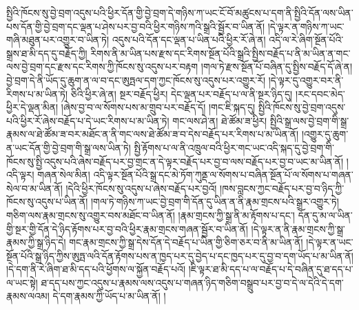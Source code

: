སྤྱིའི་ཁོངས་སུ་བྱེ་བྲག་འདུས་པའི་ཕྱིར་དོན་གྱི་བྱེ་བྲག་དེ་གཉིས་ཀ་ཡང་ངོ་བོ་མཚུངས་པ་དག་ནི་སྤྱིའི་དོན་ལས་ཡིན་པས་དོན་གྱི་བྱེ་བྲག་དང་ལྡན་པ་ཤེས་པར་བྱ་བའི་ཕྱིར་གཉིས་ཀའི་སྒྲའི་སྦྱོར་བ་ཡིན་ནོ། །དེ་ལྟར་ན་གཉིས་ཀ་ཡང་གཞི་མཐུན་པར་འགྱུར་བ་ཡིན་ཏེ། འདུས་པའི་དོན་དང་ལྡན་པ་ཡིན་པའི་ཕྱིར་རོ་ཞེ་ན། འདི་ལ་རེ་ཞིག་སྔོན་པོའི་སྒྲས་ཐ་མི་དད་དུ་བརྗོད་ཀྱི། རིགས་ནི་མ་ཡིན་པས་རྫས་དང་རིགས་སྔོན་པོའི་སྒྲའི་སྤྱིས་བརྗོད་པ་ནི་མ་ཡིན་ན་གང་ལས་བྱེ་བྲག་དང་རྫས་དང་རིགས་ཀྱི་ཁོངས་སུ་འདུས་པར་བརྟག །གལ་ཏེ་རྫས་སྔོན་པོ་བཞིན་དུ་སྤྱིས་བརྗོད་དོ་ཞེ་ན། བྱེ་བྲག་དེ་ནི་ཡོད་དུ་ཆུག་ན་ལ་བ་དང་ཨུཏྤལ་དག་ཀྱང་ཁོངས་སུ་འདུས་པར་འགྱུར་རོ། །དེ་ལྟར་དུ་འགྱུར་བར་ནི་རིགས་པ་མ་ཡིན་ཏེ། ཅིའི་ཕྱིར་ཞེ་ན། སྔར་བརྗོད་ཕྱིར། དེང་ལྡན་པར་བརྗོད་པ་ལ་ནི་སྔར་ཉིད་དུ། །རང་དབང་མེད་ཕྱིར་དེ་ལྡན་མིན། །ཞེས་བྱ་བ་ལ་སོགས་པས་མ་གྲུབ་པར་བརྗོད་དོ། །གང་ཇི་སྐད་དུ། སྤྱིའི་ཁོངས་སུ་བྱེ་བྲག་འདུས་པའི་ཕྱིར་རོ་ཞེས་བརྗོད་པ་དེ་ཡང་རིགས་པ་མ་ཡིན་ཏེ། གང་ལས་ཤེ་ན། ཐེ་ཚོམ་ཟ་ཕྱིར། སྤྱིའི་སྒྲ་ལས་བྱེ་བྲག་གི་སྒྲ་རྣམས་ལ་ཐེ་ཚོམ་ཟ་བར་མཐོང་ན་ནི་གང་ལས་ཐེ་ཚོམ་ཟ་བ་དེས་བརྗོད་པར་རིགས་པ་མ་ཡིན་ནོ། །འགྱུར་དུ་ཆུག་ན་ཡང་དོན་གྱི་བྱེ་བྲག་གི་སྒྲ་ལས་ཡིན་ཏེ། སྤྱི་རྟོགས་པ་ལ་ནི་འཁྲུལ་བའི་ཕྱིར་གང་ཡང་འདི་སྐད་དུ་བྱེ་བྲག་གི་ཁོངས་སུ་སྤྱི་འདུས་པའི་ཞེས་བརྗོད་པར་བྱ་གྲང་ན་དེ་ལྟར་བརྗོད་པར་བྱ་བ་ལས་བརྗོད་པར་བྱ་བ་ཡང་མ་ཡིན་ནོ། །འདི་ལྟར། གཞན་སེལ་མིན། འདི་ལྟར་སྔོན་པོའི་སྒྲ་དང་མེ་ཏོག་ཀུནྡ་ལ་སོགས་པ་བཞིན་སྔོན་པོ་ལ་སོགས་པ་གཞན་སེལ་བ་མ་ཡིན་ནོ། །དེའི་ཕྱིར་ཁོངས་སུ་འདུས་པ་ཞེས་བརྗོད་པར་བྱའོ། །ཁས་བླངས་ཀྱང་བརྗོད་པར་བྱ་བ་ཉིད་ཀྱི་ཁོངས་སུ་འདུས་པ་ཡིན་ནོ། །གལ་ཏེ་གཉིས་ཀ་ཡང་བྱེ་བྲག་གི་དོན་དུ་ཡིན་ན་ནི་རྣམ་གྲངས་པའི་སྒྲར་འགྱུར་ཏེ། གཅིག་ལས་རྣམ་གྲངས་སུ་འགྱུར་བས་མཐོང་བ་ཡིན་ནོ། །རྣམ་གྲངས་ཀྱི་སྒྲ་ནི་མ་རྟོགས་པ་དང་། དོན་དུ་མ་ལ་ཡིན་གྱི་སྔར་གྱི་དོན་དེ་ཉིད་རྟོགས་པར་བྱ་བའི་ཕྱིར་རྣམ་གྲངས་གཞན་སྦྱོར་བ་ཡིན་ནོ། །དེ་ལྟར་ན་ནི་རྣམ་གྲངས་ཀྱི་སྒྲ་རྣམས་ཀྱི་སྒྲ་ཉིད་དེ། གང་རྣམ་གྲངས་ཀྱི་སྒྲ་དེས་དོན་དེ་བརྗོད་པ་ཡིན་གྱི་ཅིག་ཅར་བ་ནི་མ་ཡིན་ནོ། །དེ་ལྟར་ན་ཡང་སྔོན་པོའི་སྒྲ་ཉིད་ཀྱིས་ཨུཏྤ་ལའི་དོན་རྟོགས་པས་ན་ཁྱད་པར་དུ་བྱེད་པ་དང་ཁྱད་པར་དུ་བྱ་བ་དག་ཡོད་པ་མ་ཡིན་ནོ། །དེ་དག་ནི་རེ་ཞིག་ཐ་མི་དད་པའི་ཕྱོགས་ལ་སྐྱོན་བརྗོད་པའོ། །ཇི་ལྟར་ཐ་མི་དད་པ་ལ་བརྗོད་པ་དེ་བཞིན་དུ་ཐ་དད་པ་ལ་ཡང་སྟེ། ཐ་དད་པས་ཀྱང་འདུས་པ་རྣམས་ལས་འདུས་པ་གཞན་ཉིད་གཅིག་བསྒྲུབ་པར་བྱ་བ་དེ་ལ་དེའི་དེ་དག་རྣམས་ལའམ། དེ་དག་རྣམས་ཀྱི་ཡོད་པ་མ་ཡིན་ནོ། །
